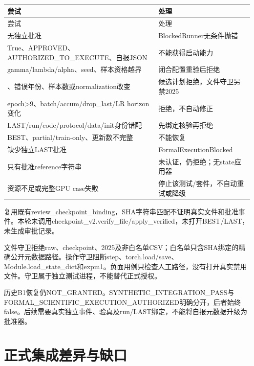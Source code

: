 \documentclass[UTF8,fontset=fandol,10pt]{ctexart}
\begin{document}
\begingroup\small\setlength{\tabcolsep}{3pt}\renewcommand{\arraystretch}{1.12}
\begin{longtable}{>{\raggedright\arraybackslash}p{\dimexpr(\linewidth-4\tabcolsep)/2\relax}>{\raggedright\arraybackslash}p{\dimexpr(\linewidth-4\tabcolsep)/2\relax}}
\toprule
尝试 & 处理 \\
\midrule\endfirsthead
尝试 & 处理 \\
\midrule\endhead
无独立批准 & BlockedRunner无条件抛错 \\
True、APPROVED、AUTHORIZED\_\allowbreak{}TO\_\allowbreak{}EXECUTE、自报JSON & 不能获得启动能力 \\
gamma/\allowbreak{}lambda/\allowbreak{}alpha、seed、样本资格越界 & 闭合配置重验后拒绝 \\
2025、错误年份、样本数或normalization改变 & 候选计划拒绝，文件守卫另禁2025 \\
epoch>9、batch/\allowbreak{}accum/\allowbreak{}drop\_\allowbreak{}last/\allowbreak{}LR horizon变化 & 拒绝，不自动修正 \\
LAST/\allowbreak{}run/\allowbreak{}code/\allowbreak{}protocol/\allowbreak{}data/\allowbreak{}init身份错配 & 先绑定核验再拒绝 \\
BEST、partial/\allowbreak{}train-only、更新数不完整 & 不能恢复 \\
缺少独立LAST批准 & FormalExecutionBlocked \\
只有批准reference字符串 & 未认证，仍拒绝；无state应用器 \\
资源不足或完整GPU case失败 & 停止该测试/\allowbreak{}套件，不自动重试或降级 \\
\bottomrule\end{longtable}\endgroup

复用既有review\_\allowbreak{}checkpoint\_\allowbreak{}binding，SHA字符串匹配不证明真实文件和批准事件。本轮未调用checkpoint\_\allowbreak{}v2.verify\_\allowbreak{}file/\allowbreak{}apply\_\allowbreak{}verified，未打开BEST/\allowbreak{}LAST，未生成审批记录。

文件守卫拒绝raw、checkpoint、2025及非白名单CSV；白名单只含SHA绑定的精确公开元数据路径。操作守卫阻断step、torch.load/\allowbreak{}save、Module.load\_\allowbreak{}state\_\allowbreak{}dict和expm1。负面用例只检查人工路径，没有打开真实禁用文件。守卫属于独立测试进程，不能替代正式授权。

历史B1恢复仍NOT\_\allowbreak{}GRANTED。SYNTHETIC\_\allowbreak{}INTEGRATION\_\allowbreak{}PASS与FORMAL\_\allowbreak{}SCIENTIFIC\_\allowbreak{}EXECUTION\_\allowbreak{}AUTHORIZED明确分开，后者始终false。后续需要真实独立事件、验真及run/\allowbreak{}LAST绑定，不能将自报元数据升级为批准器。
\clearpage\section{正式集成差异与缺口}
\end{document}
